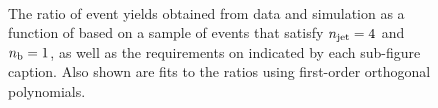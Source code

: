 \begin{figure}[h!]
  \begin{center}
    \\
    \caption{The ratio of event yields obtained from data and simulation as a function of \mht [GeV] based on a sample of \mmj events that satisfy $n_{\text{jet}} = 4$ and $n_{\text{b}} = 1$, as well as the requirements on \scalht indicated by each sub-figure caption. Also shown are fits to the ratios using first-order orthogonal polynomials.}
    \label{fig:mhtval_MuMu_eq4j_eq1b}
  \end{center}
\end{figure}

